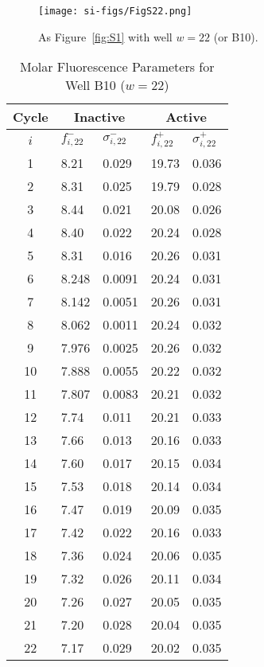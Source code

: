                \begin{figure}
                    \centering
                    \texttt{[image: si-figs/FigS22.png]}
                    \caption{
                        As Figure~\ref{fig:S1} with well $w=22$ (or B10).
                    }
                \end{figure}
                \clearpage
    \begin{table}
        \caption{Molar Fluorescence Parameters for Well B10 ($w=22$)}
        \centering
        \begin{tabular}{c|ll|ll}
            Cycle & \multicolumn{2}{c|}{Inactive} & \multicolumn{2}{c}{Active} \\
            \hline
            $i$ & $f_{i,22}^{-}$ & $\sigma_{i,22}^{-}$ &  $f_{i,22}^{+}$ & $\sigma_{i,22}^{+}$ \\
            \hline
    1 & 8.21 & 0.029 & 19.73 & 0.036 \\
2 & 8.31 & 0.025 & 19.79 & 0.028 \\
3 & 8.44 & 0.021 & 20.08 & 0.026 \\
4 & 8.40 & 0.022 & 20.24 & 0.028 \\
5 & 8.31 & 0.016 & 20.26 & 0.031 \\
6 & 8.248 & 0.0091 & 20.24 & 0.031 \\
7 & 8.142 & 0.0051 & 20.26 & 0.031 \\
8 & 8.062 & 0.0011 & 20.24 & 0.032 \\
9 & 7.976 & 0.0025 & 20.26 & 0.032 \\
10 & 7.888 & 0.0055 & 20.22 & 0.032 \\
11 & 7.807 & 0.0083 & 20.21 & 0.032 \\
12 & 7.74 & 0.011 & 20.21 & 0.033 \\
13 & 7.66 & 0.013 & 20.16 & 0.033 \\
14 & 7.60 & 0.017 & 20.15 & 0.034 \\
15 & 7.53 & 0.018 & 20.14 & 0.034 \\
16 & 7.47 & 0.019 & 20.09 & 0.035 \\
17 & 7.42 & 0.022 & 20.16 & 0.033 \\
18 & 7.36 & 0.024 & 20.06 & 0.035 \\
19 & 7.32 & 0.026 & 20.11 & 0.034 \\
20 & 7.26 & 0.027 & 20.05 & 0.035 \\
21 & 7.20 & 0.028 & 20.04 & 0.035 \\
22 & 7.17 & 0.029 & 20.02 & 0.035 \\

\end{tabular}
\end{table}
